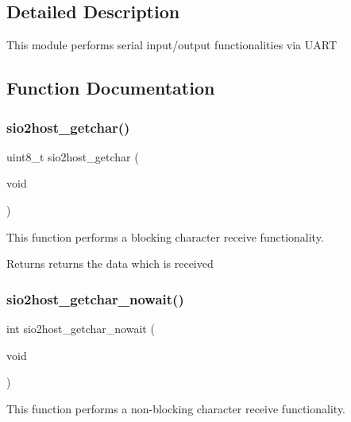 \subsection{Detailed Description}
This module performs serial input/output functionalities via U\+A\+RT 

\subsection{Function Documentation}
\mbox{\label{group__group__sio2host__uart_gabbb6def1150d2663a675bd384ae816d0}} 
\subsubsection{\texorpdfstring{sio2host\_getchar()}{sio2host\_getchar()}}
{\footnotesize\ttfamily uint8\+\_\+t sio2host\+\_\+getchar (\begin{DoxyParamCaption}\item[{void}]{ }\end{DoxyParamCaption})}



This function performs a blocking character receive functionality. 

\begin{DoxyReturn}{Returns}
returns the data which is received 
\end{DoxyReturn}
\mbox{\label{group__group__sio2host__uart_ga14c4b363b78d5be00daa0bdd56e6a4a9}} 
\subsubsection{\texorpdfstring{sio2host\_getchar\_nowait()}{sio2host\_getchar\_nowait()}}
{\footnotesize\ttfamily int sio2host\+\_\+getchar\+\_\+nowait (\begin{DoxyParamCaption}\item[{void}]{ }\end{DoxyParamCaption})}



This function performs a non-\/blocking character receive functionality. 

